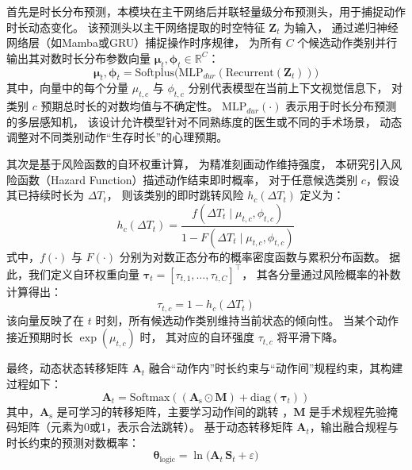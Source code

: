 首先是时长分布预测，本模块在主干网络后并联轻量级分布预测头，用于捕捉动作时长动态变化。
该预测头以主干网络提取的时空特征 \(\mathbf{Z}_t\) 为输入， 
通过递归神经网络层（如Mamba或GRU）捕捉操作时序规律， 为所有 \(C\) 个候选动作类别并行输出其对数时长分布参数向量 
\(\boldsymbol{\mu}_t, \boldsymbol{\phi}_t \in \mathbb{R}^C\)：
\begin{equation}
    \boldsymbol{\mu}_t, \boldsymbol{\phi}_t = 
    \mathrm{Softplus}\big(\mathrm{MLP}_{dur}(\mathrm{Recurrent}(\mathbf{Z}_t))\big)
\label{eq:alg2_dur_pred}
\end{equation}
其中，向量中的每个分量 \(\mu_{t,c}\) 与 \(\phi_{t,c}\) 分别代表模型在当前上下文视觉信息下，
对类别 \(c\) 预期总时长的对数均值与不确定性。
\(\text{MLP}_{dur}(\cdot)\) 表示用于时长分布预测的多层感知机，
该设计允许模型针对不同熟练度的医生或不同的手术场景，
动态调整对不同类别动作“生存时长”的心理预期。

其次是基于风险函数的自环权重计算，
为精准刻画动作维持强度，
本研究引入风险函数（Hazard Function）描述动作结束即时概率，
对于任意候选类别 \(c\)，假设其已持续时长为 \(\Delta T_t\)，
则该类别的即时跳转风险 \(h_c(\Delta T_t)\) 定义为：
\begin{equation}
    h_c(\Delta T_t) = \frac{f(\Delta T_t \mid \mu_{t,c}, 
    \phi_{t,c})}{1 - F(\Delta T_t \mid \mu_{t,c}, \phi_{t,c})}
\label{eq:alg2_hazard}
\end{equation}
式中，\(f(\cdot)\) 与 \(F(\cdot)\) 分别为对数正态分布的概率密度函数与累积分布函数。
据此，我们定义自环权重向量 
\(\boldsymbol{\tau}_t = [\tau_{t,1}, \dots, \tau_{t,C}]^\top\)，
其各分量通过风险概率的补数计算得出：
\begin{equation}
    \tau_{t,c} = 1 - h_c(\Delta T_t)
\label{eq:alg2_tau}
\end{equation}
该向量反映了在 \(t\) 时刻，所有候选动作类别维持当前状态的倾向性。
当某个动作接近预期时长 \(\exp(\mu_{t,c})\) 时，
其对应的自环强度 \(\tau_{t,c}\) 将平滑下降。

最终，动态状态转移矩阵 \(\mathbf{A}_t\) 融合“动作内”时长约束与“动作间”规程约束，其构建过程如下：
\begin{equation}
    \mathbf{A}_t = \mathrm{Softmax}\left( (\mathbf{A}_{\mathrm{s}} \odot \mathbf{M}) 
    + \mathrm{diag}(\boldsymbol{\tau}_t) \right)
\label{eq:alg2_dynamic_transition}
\end{equation}
其中，\(\mathbf{A}_{\mathrm{s}}\) 是可学习的转移矩阵，主要学习动作间的跳转
，\(\mathbf{M}\) 是手术规程先验掩码矩阵（元素为0或1，表示合法跳转）。
基于动态转移矩阵 \(\mathbf{A}_t\)，输出融合规程与时长约束的预测对数概率：
\begin{equation}
    \mathbf{\theta}_{\mathrm{logic}} = \ln\big( \mathbf{A}_t \, \mathbf{S}_t + \varepsilon \big)
\label{eq:alg2_logic_pred}
\end{equation}

